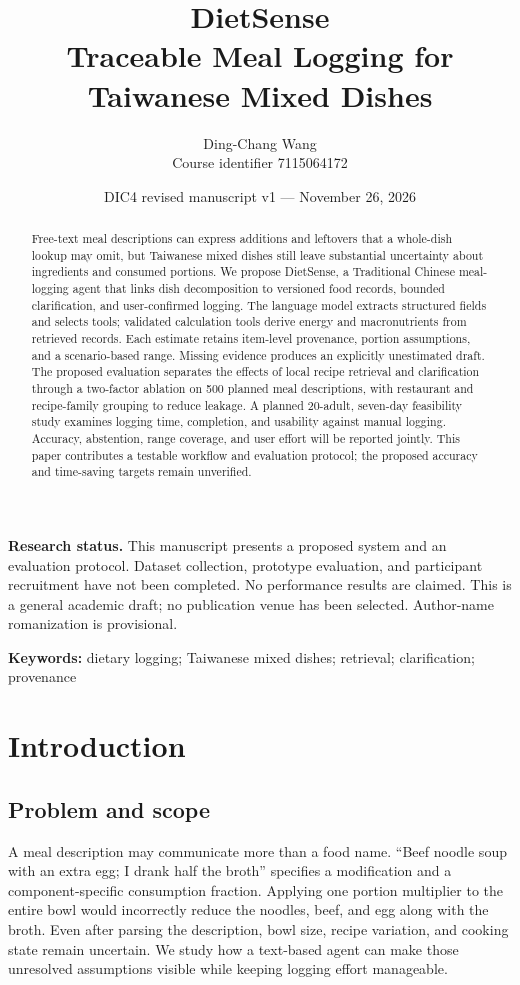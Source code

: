 \documentclass[11pt,a4paper]{article}
\title{DietSense\\Traceable Meal Logging for Taiwanese Mixed Dishes}
\author{Ding-Chang Wang\\Course identifier 7115064172}
\date{DIC4 revised manuscript v1 --- November 26, 2026}
\begin{document}
\maketitle
\textbf{Research status.} This manuscript presents a proposed system and an evaluation protocol. Dataset collection, prototype evaluation, and participant recruitment have not been completed. No performance results are claimed. This is a general academic draft; no publication venue has been selected. Author-name romanization is provisional.
\begin{abstract}
Free-text meal descriptions can express additions and leftovers that a whole-dish lookup may omit, but Taiwanese mixed dishes still leave substantial uncertainty about ingredients and consumed portions. We propose DietSense, a Traditional Chinese meal-logging agent that links dish decomposition to versioned food records, bounded clarification, and user-confirmed logging. The language model extracts structured fields and selects tools; validated calculation tools derive energy and macronutrients from retrieved records. Each estimate retains item-level provenance, portion assumptions, and a scenario-based range. Missing evidence produces an explicitly unestimated draft. The proposed evaluation separates the effects of local recipe retrieval and clarification through a two-factor ablation on 500 planned meal descriptions, with restaurant and recipe-family grouping to reduce leakage. A planned 20-adult, seven-day feasibility study examines logging time, completion, and usability against manual logging. Accuracy, abstention, range coverage, and user effort will be reported jointly. This paper contributes a testable workflow and evaluation protocol; the proposed accuracy and time-saving targets remain unverified.
\end{abstract}
\noindent\textbf{Keywords:} dietary logging; Taiwanese mixed dishes; retrieval; clarification; provenance

\section{Introduction}
\subsection{Problem and scope}
A meal description may communicate more than a food name. ``Beef noodle soup with an extra egg; I drank half the broth'' specifies a modification and a component-specific consumption fraction. Applying one portion multiplier to the entire bowl would incorrectly reduce the noodles, beef, and egg along with the broth. Even after parsing the description, bowl size, recipe variation, and cooking state remain uncertain. We study how a text-based agent can make those unresolved assumptions visible while keeping logging effort manageable.
\end{document}
